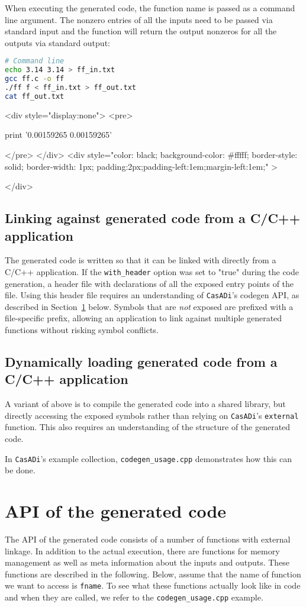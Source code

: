 \documentclass[a4paper,12pt]{book}
\newcommand{\CasADi}{\texttt{CasADi}\xspace}
\newcounter{pytexcount}
\newcounter{pytexsubcount}
\renewenvironment{pytexoutput}
{\addtocounter{pytexsubcount}{1}%
\begin{rawhtml}
<div style="display:none">
<pre>
\end{rawhtml}
}%
{\begin{rawhtml}
</pre>
</div>
<div style="color: black; background-color: \#fffff;  border-style: solid; border-width: 1px; padding:2px;padding-left:1em;margin-left:1em;" >\end{rawhtml}%
\verbatiminputeval{pytex_\alph{pytexcount}_\arabic{pytexsubcount}.log}%
\begin{rawhtml}
</div>
\end{rawhtml}
}
\begin{document}
When executing the generated code, the function name is passed
as a command line argument. The nonzero entries of all the inputs
need to be passed via standard input and the function will return the output
nonzeros for all the outputs via standard output:

\begin{lstlisting}[language=sh]
# Command line
echo 3.14 3.14 > ff_in.txt
gcc ff.c -o ff
./ff f < ff_in.txt > ff_out.txt
cat ff_out.txt
\end{lstlisting}
\begin{pytexoutput}
print '0.00159265 0.00159265'
\end{pytexoutput}

\subsection*{Linking against generated code from a C/C++ application}
The generated code is written so that it can be linked with directly from a C/C++
application. If the \verb|with_header| option was set to "true" during the
code generation, a header file with declarations of all the exposed entry points
of the file. Using this header file requires an understanding of \CasADi's
codegen API, as described in Section~\ref{sec:c_api} below. Symbols that are
\emph{not} exposed are prefixed with a file-specific prefix, allowing an
application to link against multiple generated functions without risking
symbol conflicts.

\subsection*{Dynamically loading generated code from a C/C++ application}
A variant of above is to compile the generated code into a shared library,
but directly accessing the exposed symbols rather than relying on \CasADi's
\texttt{external} function. This also requires an understanding of the structure
of the generated code.

In \CasADi's example collection, \verb|codegen_usage.cpp| demonstrates how this
can be done.

\section{API of the generated code} \label{sec:c_api}
The API of the generated code consists of a number of functions with external
linkage. In addition to the actual execution, there are functions for memory
management as well as meta information about the inputs and outputs.
These functions are described in the following. Below, assume that the name of
function we want to access is \texttt{fname}. To see what these functions actually
look like in code and when they are called, we refer to the
\verb|codegen_usage.cpp| example.
\end{document}

